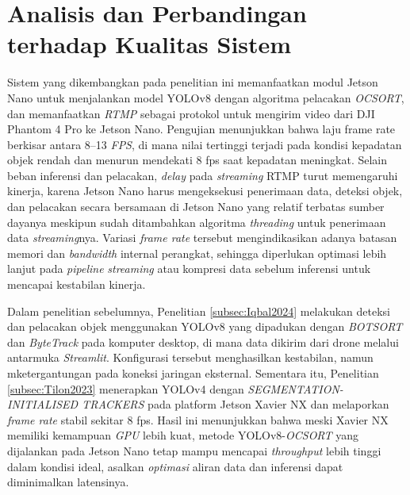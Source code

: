 \section{Analisis dan Perbandingan terhadap Kualitas Sistem}
Sistem yang dikembangkan pada penelitian ini memanfaatkan modul Jetson Nano untuk menjalankan model YOLOv8 dengan algoritma pelacakan \emph{OCSORT}, dan memanfaatkan \emph{RTMP} sebagai protokol untuk mengirim video dari DJI Phantom 4 Pro ke Jetson Nano. Pengujian menunjukkan bahwa laju frame rate berkisar antara 8–13 \emph{FPS}, di mana nilai tertinggi terjadi pada kondisi kepadatan objek rendah dan menurun mendekati 8 fps saat kepadatan meningkat. Selain beban inferensi dan pelacakan, \emph{delay} pada \emph{streaming} RTMP turut memengaruhi kinerja, karena Jetson Nano harus mengeksekusi penerimaan data, deteksi objek, dan pelacakan secara bersamaan di Jetson Nano yang relatif terbatas sumber dayanya meskipun sudah ditambahkan algoritma \emph{threading} untuk penerimaan data \emph{streaming}nya. Variasi \emph{frame rate} tersebut mengindikasikan adanya batasan memori dan \emph{bandwidth} internal perangkat, sehingga diperlukan optimasi lebih lanjut pada \emph{pipeline} \emph{streaming} atau kompresi data sebelum inferensi untuk mencapai kestabilan kinerja.

Dalam penelitian sebelumnya, Penelitian \ref{subsec:Iqbal2024} melakukan deteksi dan pelacakan objek menggunakan YOLOv8 yang dipadukan dengan \emph{BOTSORT} dan \emph{ByteTrack} pada komputer desktop, di mana data dikirim dari drone melalui antarmuka \emph{Streamlit}. Konfigurasi tersebut menghasilkan kestabilan, namun mketergantungan pada koneksi jaringan eksternal. Sementara itu, Penelitian \ref{subsec:Tilon2023} menerapkan YOLOv4 dengan \emph{SEGMENTATION-INITIALISED TRACKERS} pada platform Jetson Xavier NX dan melaporkan \emph{frame rate} stabil sekitar 8 fps. Hasil ini menunjukkan bahwa meski Xavier NX memiliki kemampuan \emph{GPU} lebih kuat, metode YOLOv8-\emph{OCSORT} yang dijalankan pada Jetson Nano tetap mampu mencapai \emph{throughput} lebih tinggi dalam kondisi ideal, asalkan \emph{optimasi} aliran data dan inferensi dapat diminimalkan latensinya.

